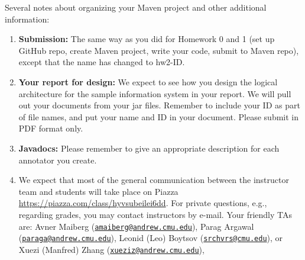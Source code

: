 \documentclass[oneside]{memoir}
\begin{document}
\begin{titlingpage}
\begin{minipage}{1.2\textwidth}
Several notes about organizing your Maven project and other additional
information:

\begin{enumerate}

\item \textbf{Submission:} The same way as you did for Homework 0 and 1 (set up
GitHub repo, create Maven project, write your code, submit to Maven repo),
except that the name has changed to hw2-ID.

\item \textbf{Your report for design:} We expect to see how you design the
logical architecture for the sample information system in your report. We will
pull out your documents from your jar files. Remember to include your ID as part
of file names, and put your name and ID in your document. Please submit in PDF
format only.

\item \textbf{Javadocs:} Please remember to give an appropriate description for
each annotator you create.

\item 
We expect that most of the general communication between the instructor team and students will take place on Piazza
\url{https://piazza.com/class/hyvsubeilei6dd}.
For private questions, e.g., regarding grades, you may contact instructors by e-mail.
Your friendly TAs are:
Avner Maiberg (\href{mailto:amaiberg@andrew.cmu.edu}{\nolinkurl{amaiberg@andrew.cmu.edu}}), 
Parag Argawal (\href{mailto:paraga@andrew.cmu.edu}{\nolinkurl{paraga@andrew.cmu.edu}}), 
Leonid (Leo) Boytsov (\href{mailto:srchvrs@cmu.edu}{\nolinkurl{srchvrs@cmu.edu}}), or 
Xuezi (Manfred) Zhang (\href{mailto:xueziz@andrew.cmu.edu}{\nolinkurl{xueziz@andrew.cmu.edu}}), 

\end{enumerate}

\end{minipage}
\hspace{-0.1\textwidth}

\end{titlingpage}




\end{document}
